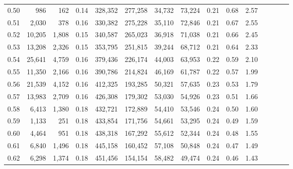 \begin{tabular}{rrrcrrrrrrrrrrr}
0.50 &     986 &    162 &                                       0.14 &  328,352 &  277,258 &   34,732 &   73,224 &  0.21 &  0.68 &                         2.57 \\
0.51 &   2,030 &    378 &                                       0.16 &  330,382 &  275,228 &   35,110 &   72,846 &  0.21 &  0.67 &                         2.55 \\
0.52 &  10,205 &  1,808 &                                       0.15 &  340,587 &  265,023 &   36,918 &   71,038 &  0.21 &  0.66 &                         2.45 \\
0.53 &  13,208 &  2,326 &                                       0.15 &  353,795 &  251,815 &   39,244 &   68,712 &  0.21 &  0.64 &                         2.33 \\
0.54 &  25,641 &  4,759 &                                       0.16 &  379,436 &  226,174 &   44,003 &   63,953 &  0.22 &  0.59 &                         2.10 \\
0.55 &  11,350 &  2,166 &                                       0.16 &  390,786 &  214,824 &   46,169 &   61,787 &  0.22 &  0.57 &                         1.99 \\
0.56 &  21,539 &  4,152 &                                       0.16 &  412,325 &  193,285 &   50,321 &   57,635 &  0.23 &  0.53 &                         1.79 \\
0.57 &  13,983 &  2,709 &                                       0.16 &  426,308 &  179,302 &   53,030 &   54,926 &  0.23 &  0.51 &                         1.66 \\
0.58 &   6,413 &  1,380 &                                       0.18 &  432,721 &  172,889 &   54,410 &   53,546 &  0.24 &  0.50 &                         1.60 \\
0.59 &   1,133 &    251 &                                       0.18 &  433,854 &  171,756 &   54,661 &   53,295 &  0.24 &  0.49 &                         1.59 \\
0.60 &   4,464 &    951 &                                       0.18 &  438,318 &  167,292 &   55,612 &   52,344 &  0.24 &  0.48 &                         1.55 \\
0.61 &   6,840 &  1,496 &                                       0.18 &  445,158 &  160,452 &   57,108 &   50,848 &  0.24 &  0.47 &                         1.49 \\
0.62 &   6,298 &  1,374 &                                       0.18 &  451,456 &  154,154 &   58,482 &   49,474 &  0.24 &  0.46 &                         1.43 \\

\end{tabular}
